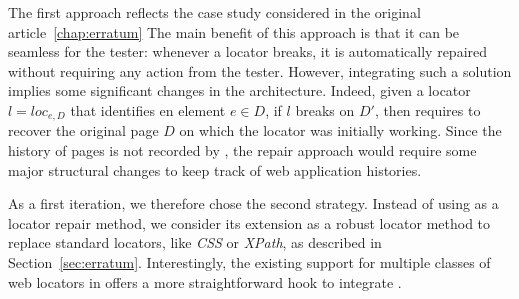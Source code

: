 The first approach reflects the case study considered in the original \erratum article~\ref{chap:erratum}
The main benefit of this approach is that it can be seamless for the tester: whenever a locator breaks, it is automatically repaired without requiring any action from the tester.
However, integrating such a solution implies some significant changes in the \cerberus architecture.
Indeed, given a locator $l = loc_{e,D}$ that identifies en element $e \in D$, if $l$ breaks on $D'$, then \erratum requires to recover the original page $D$ on which the locator was initially working.
Since the history of pages is not recorded by \cerberus, the repair approach would require some major structural changes to keep track of web application histories.

As a first iteration, we therefore chose the second strategy.
Instead of using \erratum as a locator repair method, we consider its extension as a robust locator method to replace standard locators, like \textit{CSS} or \textit{XPath}, as described in Section~\ref{sec:erratum}.
Interestingly, the existing support for multiple classes of web locators in \cerberus offers a more straightforward hook to integrate \erratum.

